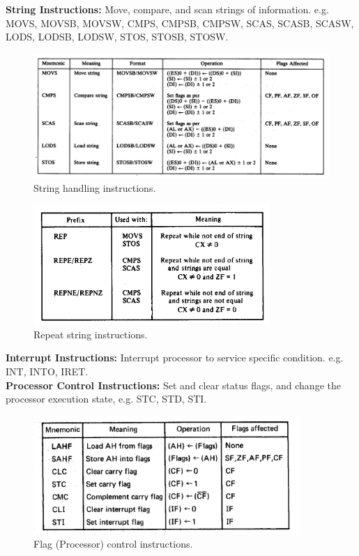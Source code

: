 \documentclass[12pt, a4paper]{scrartcl}
\begin{document}
	\textbf{String Instructions: }Move, compare, and scan strings of information. e.g. MOVS, MOVSB, MOVSW, CMPS, CMPSB, CMPSW, SCAS, SCASB, SCASW, LODS, LODSB, LODSW, STOS, STOSB, STOSW.\\ 
	\begin{figure}[h]
		\centering
		\includegraphics[width=\textwidth]{images/string.png}
		\caption{String handling instructions.}
		\label{image-13}
	\end{figure}
	\begin{figure}[h]
		\centering
		\includegraphics[width=0.8\textwidth]{images/repeat-string.png}
		\caption{Repeat string instructions.}
		\label{image-14}
	\end{figure}
	
	\textbf{Interrupt Instructions: }Interrupt processor to service specific condition. e.g. INT, INTO, IRET.\\ 
	
	\textbf{Processor Control Instructions: }Set and clear status flags, and change the processor execution state, e.g. STC, STD, STI.\\ 
	\begin{figure}[h]
		\centering
		\includegraphics[width=0.9\textwidth]{images/flag.png}
		\caption{Flag (Processor) control instructions.}
		\label{image-15}
	\end{figure}
	
\end{document}
